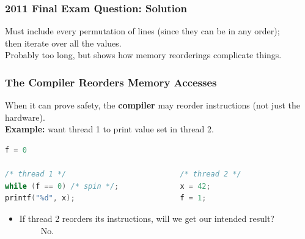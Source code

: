 \begin{frame}[fragile]
  \frametitle{2011 Final Exam Question: Solution}

  
    Must include every permutation of lines (since they can be in
      any order);\\
    then iterate over all the values.\\[1em]

    Probably too long, but shows how memory reorderings
      complicate things.
  
\end{frame}

\begin{frame}[fragile]
  \frametitle{The Compiler Reorders Memory Accesses}

  
  When it can prove safety, the {\bf compiler} may reorder instructions (not just the hardware).\\[1em]

  {\bf Example:} want thread 1 to print value set in thread 2.

  \begin{lstlisting}[language=C]
                            f = 0

/* thread 1 */                          /* thread 2 */
while (f == 0) /* spin */;              x = 42;
printf("%d", x);                        f = 1;
  \end{lstlisting}

  \begin{itemize}
    \item If thread 2 reorders its instructions, will we get our intended
      result?\\[1em]
     \alert{~~~~~No.}
  \end{itemize}
  
\end{frame}



